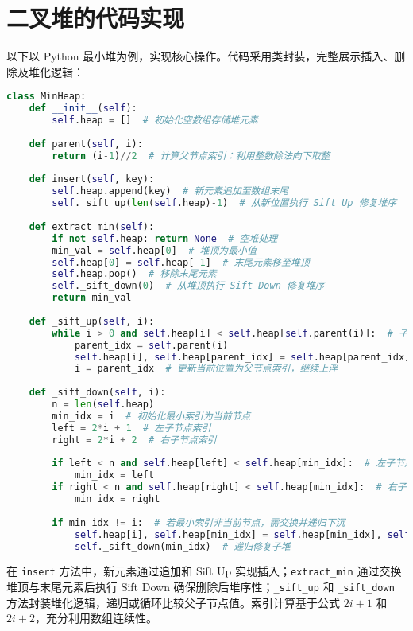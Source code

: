 \chapter{二叉堆的代码实现}
以下以 Python 最小堆为例，实现核心操作。代码采用类封装，完整展示插入、删除及堆化逻辑：\par
\begin{lstlisting}[language=python]
class MinHeap:
    def __init__(self):
        self.heap = []  # 初始化空数组存储堆元素
    
    def parent(self, i):
        return (i-1)//2  # 计算父节点索引：利用整数除法向下取整
    
    def insert(self, key):
        self.heap.append(key)  # 新元素追加至数组末尾
        self._sift_up(len(self.heap)-1)  # 从新位置执行 Sift Up 修复堆序
    
    def extract_min(self):
        if not self.heap: return None  # 空堆处理
        min_val = self.heap[0]  # 堆顶为最小值
        self.heap[0] = self.heap[-1]  # 末尾元素移至堆顶
        self.heap.pop()  # 移除末尾元素
        self._sift_down(0)  # 从堆顶执行 Sift Down 修复堆序
        return min_val
    
    def _sift_up(self, i):
        while i > 0 and self.heap[i] < self.heap[self.parent(i)]:  # 子节点小于父节点时违反最小堆性质
            parent_idx = self.parent(i)
            self.heap[i], self.heap[parent_idx] = self.heap[parent_idx], self.heap[i]  # 交换父子节点
            i = parent_idx  # 更新当前位置为父节点索引，继续上浮
    
    def _sift_down(self, i):
        n = len(self.heap)
        min_idx = i  # 初始化最小索引为当前节点
        left = 2*i + 1  # 左子节点索引
        right = 2*i + 2  # 右子节点索引
        
        if left < n and self.heap[left] < self.heap[min_idx]:  # 左子节点存在且更小
            min_idx = left
        if right < n and self.heap[right] < self.heap[min_idx]:  # 右子节点存在且更小
            min_idx = right
            
        if min_idx != i:  # 若最小索引非当前节点，需交换并递归下沉
            self.heap[i], self.heap[min_idx] = self.heap[min_idx], self.heap[i]
            self._sift_down(min_idx)  # 递归修复子堆
\end{lstlisting}
在 \texttt{insert} 方法中，新元素通过追加和 Sift Up 实现插入；\texttt{extract\_{}min} 通过交换堆顶与末尾元素后执行 Sift Down 确保删除后堆序性；\texttt{\_{}sift\_{}up} 和 \texttt{\_{}sift\_{}down} 方法封装堆化逻辑，递归或循环比较父子节点值。索引计算基于公式 $2i+1$ 和 $2i+2$，充分利用数组连续性。\par
